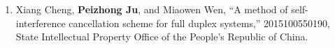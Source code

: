 \documentclass[10pt,letter]{article}
\begin{document}
\begin{small}
\begin{enumerate}[itemsep=0.6em]
    \item Xiang Cheng, \textbf{Peizhong Ju}, and Miaowen Wen, ``A method of self-interference cancellation scheme for full duplex systems,'' 2015100550190, State Intellectual Property Office of the People's Republic of China.
\end{enumerate}












\end{small}
\end{document}

